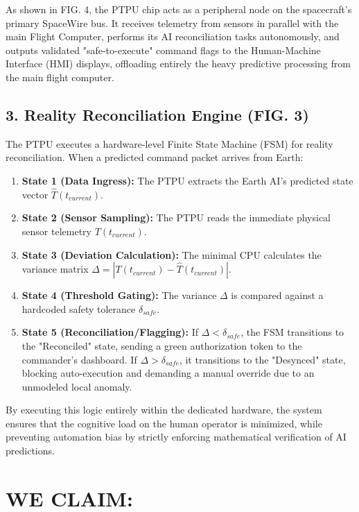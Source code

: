 \documentclass[12pt,a4paper]{article}
\begin{document}
As shown in FIG. 4, the PTPU chip acts as a peripheral node on the spacecraft's primary SpaceWire bus. It receives telemetry from sensors in parallel with the main Flight Computer, performs its AI reconciliation tasks autonomously, and outputs validated "safe-to-execute" command flags to the Human-Machine Interface (HMI) displays, offloading entirely the heavy predictive processing from the main flight computer.

\subsection*{3. Reality Reconciliation Engine (FIG. 3)}
The PTPU executes a hardware-level Finite State Machine (FSM) for reality reconciliation. When a predicted command packet arrives from Earth:
\begin{enumerate}
    \item \textbf{State 1 (Data Ingress):} The PTPU extracts the Earth AI's predicted state vector $\hat{T}(t_{current})$.
    \item \textbf{State 2 (Sensor Sampling):} The PTPU reads the immediate physical sensor telemetry $T(t_{current})$.
    \item \textbf{State 3 (Deviation Calculation):} The minimal CPU calculates the variance matrix $\Delta = |T(t_{current}) - \hat{T}(t_{current})|$.
    \item \textbf{State 4 (Threshold Gating):} The variance $\Delta$ is compared against a hardcoded safety tolerance $\delta_{safe}$.
    \item \textbf{State 5 (Reconciliation/Flagging):} If $\Delta < \delta_{safe}$, the FSM transitions to the "Reconciled" state, sending a green authorization token to the commander's dashboard. If $\Delta > \delta_{safe}$, it transitions to the "Desynced" state, blocking auto-execution and demanding a manual override due to an unmodeled local anomaly.
\end{enumerate}

By executing this logic entirely within the dedicated hardware, the system ensures that the cognitive load on the human operator is minimized, while preventing automation bias by strictly enforcing mathematical verification of AI predictions.

\newpage

\section*{WE CLAIM:}
\end{document}
